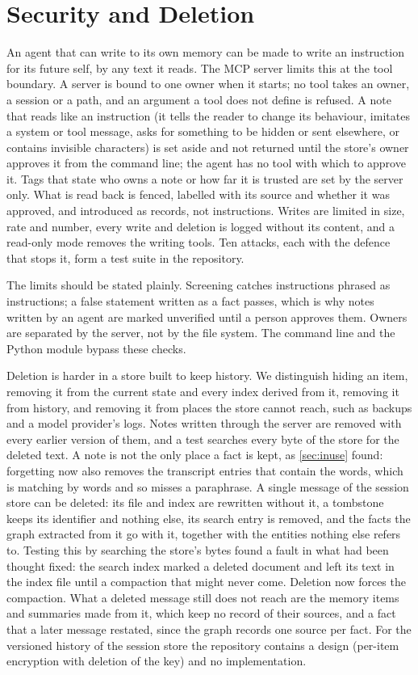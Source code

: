\documentclass[11pt,letterpaper]{article}
\begin{document}
\section{Security and Deletion}
\label{sec:security}

An agent that can write to its own memory can be made to write an instruction for its future self, by any text it reads. The MCP server limits this at the tool boundary. A server is bound to one owner when it starts; no tool takes an owner, a session or a path, and an argument a tool does not define is refused. A note that reads like an instruction (it tells the reader to change its behaviour, imitates a system or tool message, asks for something to be hidden or sent elsewhere, or contains invisible characters) is set aside and not returned until the store's owner approves it from the command line; the agent has no tool with which to approve it. Tags that state who owns a note or how far it is trusted are set by the server only. What is read back is fenced, labelled with its source and whether it was approved, and introduced as records, not instructions. Writes are limited in size, rate and number, every write and deletion is logged without its content, and a read-only mode removes the writing tools. Ten attacks, each with the defence that stops it, form a test suite in the repository.

The limits should be stated plainly. Screening catches instructions phrased as instructions; a false statement written as a fact passes, which is why notes written by an agent are marked unverified until a person approves them. Owners are separated by the server, not by the file system. The command line and the Python module bypass these checks.

Deletion is harder in a store built to keep history. We distinguish hiding an item, removing it from the current state and every index derived from it, removing it from history, and removing it from places the store cannot reach, such as backups and a model provider's logs. Notes written through the server are removed with every earlier version of them, and a test searches every byte of the store for the deleted text. A note is not the only place a fact is kept, as \cref{sec:inuse} found: forgetting now also removes the transcript entries that contain the words, which is matching by words and so misses a paraphrase. A single message of the session store can be deleted: its file and index are rewritten without it, a tombstone keeps its identifier and nothing else, its search entry is removed, and the facts the graph extracted from it go with it, together with the entities nothing else refers to. Testing this by searching the store's bytes found a fault in what had been thought fixed: the search index marked a deleted document and left its text in the index file until a compaction that might never come. Deletion now forces the compaction. What a deleted message still does not reach are the memory items and summaries made from it, which keep no record of their sources, and a fact that a later message restated, since the graph records one source per fact. For the versioned history of the session store the repository contains a design (per-item encryption with deletion of the key) and no implementation.
\end{document}

